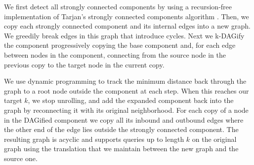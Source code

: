 We first detect all strongly connected components by using a recursion-free implementation of Tarjan's strongly connected components algorithm \cite{tarjan1972depth}.
Then, we copy each strongly connected component and its internal edges into a new graph.
We greedily break edges in this graph that introduce cycles.
Next we k-DAGify the component progressively copying the base component and, for each edge between nodes in the component, connecting from the source node in the previous copy to the target node in the current copy.

We use dynamic programming to track the minimum distance back through the graph to a root node outside the component at each step.
When this reaches our target $k$, we stop unrolling, and add the expanded component back into the graph by reconnecting it with its original neighborhood.
For each copy of a node in the DAGified component we copy all its inbound and outbound edges where the other end of the edge lies outside the strongly connected component.
The resulting graph is acyclic and supports queries up to length $k$ on the original graph using the translation that we maintain between the new graph and the source one.

